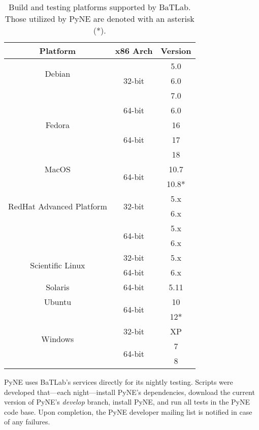 \documentclass{anstrans}
\begin{document}
\begin{table}[ht]
  \begin{center}
    \caption{\label{tab::batlab}Build and testing platforms supported by BaTLab. 
      Those utilized by PyNE are denoted with an asterisk (*).}
    \begin{tabular}{|c|c|c|}
    \hline
    Platform & x86 Arch & Version \\
    \hline
    \multirow{2}{*}{Debian} 
    & \multirow{3}{*}{32-bit} & 5.0 \\ & & 6.0 \\ & & 7.0 \\ 
    \cline{2-3}
    & \multirow{1}{*}{64-bit} & 6.0 \\
    \hline
    \multirow{1}{*}{Fedora} 
    & \multirow{3}{*}{64-bit} & 16 \\ & & 17 \\ & & 18 \\
    \hline
    \multirow{1}{*}{MacOS} 
    & \multirow{2}{*}{64-bit} & 10.7 \\ & & 10.8* \\
    \hline
    \multirow{2}{*}{RedHat Advanced Platform} 
    & \multirow{2}{*}{32-bit} & 5.x \\ & & 6.x \\ 
    \cline{2-3}
    & \multirow{2}{*}{64-bit} & 5.x \\ & & 6.x \\
    \hline
    \multirow{2}{*}{Scientific Linux} 
    & \multirow{1}{*}{32-bit} & 5.x \\ 
    \cline{2-3}
    & \multirow{1}{*}{64-bit} & 6.x \\
    \hline
    \multirow{1}{*}{Solaris} 
    & \multirow{1}{*}{64-bit} & 5.11 \\
    \hline
    \multirow{1}{*}{Ubuntu} 
    & \multirow{2}{*}{64-bit} & 10 \\ & & 12* \\
    \hline
    \multirow{2}{*}{Windows} 
    & \multirow{1}{*}{32-bit} & XP \\ 
    \cline{2-3}
    & \multirow{2}{*}{64-bit} & 7 \\ & & 8 \\
    \hline
    \end{tabular}
  \end{center}
\end{table}

PyNE uses BaTLab's services directly for its nightly testing. Scripts were
developed that---each night---install PyNE's dependencies, download the current version
of PyNE's \textit{develop} branch, install PyNE, and run all tests in the PyNE
code base. Upon completion, the PyNE developer mailing list is notified in case of
any failures.
\end{document}
